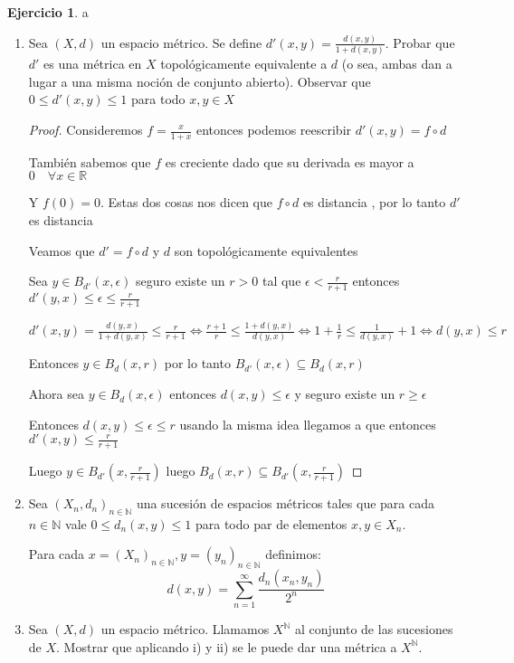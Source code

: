 \documentclass[12pt]{article}
\newcommand{\R}{\mathbb{R}}
\newcommand{\N}{\mathbb{N}}
\theoremstyle{definition}
\newtheorem{ej}{Ejercicio}
\begin{document}
\begin{ej} a\\

  \begin{enumerate}
    \item Sea $(X,d)$ un espacio métrico. Se define $d'(x,y) = \frac{d(x,y)}{1 + d(x,y)}$. Probar que $d'$ es una métrica en $X$ topológicamente equivalente a $d$ (o sea, ambas dan a lugar a una misma noción de conjunto abierto). Observar que $0 \leq d'(x,y)\leq 1$ para todo $x,y \in X$
      \begin{proof}
	Consideremos $f = \frac{x}{1 + x}$ entonces podemos reescribir $d'(x,y) = f \circ d$

	También sabemos que $f$ es creciente dado que su derivada es mayor a $0 \quad \forall x \in \R$

	Y $f(0) = 0$. Estas dos cosas nos dicen que $f \circ d $ es distancia , por lo tanto $d'$ es distancia
      
  
Veamos que $d' = f \circ d$ y $d$ son topológicamente equivalentes

Sea $y \in B_{d'}(x,\epsilon)$  seguro existe un $r > 0$ tal que $\epsilon < \frac{r}{r+1}$ entonces $d'(y,x) \leq \epsilon \leq \frac{r}{r +1}$

$d'(x,y) = \frac{d(y,x)}{1 + d(y,x)} \leq \frac{r}{r+1} \iff \frac{r+1}{r} \leq \frac{1 + d(y,x)}{d(y,x)} \iff 1 + \frac{1}{r} \leq \frac{1}{d(y,x)} + 1 \iff d(y,x) \leq r$

Entonces $y \in B_d(x,r)$ por lo tanto $B_{d'}(x,\epsilon) \subseteq B_{d}(x,r)$

Ahora sea $y \in B_d(x,\epsilon)$ entonces $d(x,y) \leq \epsilon$ y seguro existe un $r \geq \epsilon$

Entonces $d(x,y) \leq \epsilon \leq r$ usando la misma idea llegamos a que entonces $d'(x,y) \leq \frac{r}{r+1}$

Luego $y \in B_{d'}(x,\frac{r}{r+1})$ luego $B_d(x,r) \subseteq B_{d'}(x,\frac{r}{r+1})$


      \end{proof}
    \item Sea $(X_n,d_n)_{n \in \N}$ una sucesión de espacios métricos tales que para cada $n \in \N$ vale $0 \leq d_n(x,y)\leq 1$ para todo par de elementos $x,y \in X_n$. 

      Para cada $x  = (X_n)_{n \in \N}, y = (y_n)_{n \in \N}$ definimos:
    $$ d(x,y) = \sum_{n = 1}^{\infty} \frac{d_n(x_n,y_n)}{2^n}$$
\item Sea $(X,d)$ un espacio métrico. Llamamos $X^{\N}$ al conjunto de las sucesiones de $X$. Mostrar que aplicando i) y ii) se le puede dar una métrica a $X^{\N}.$


  \end{enumerate}
\end{ej}
\end{document}
